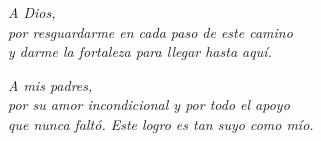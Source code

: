 
\vspace*{\fill}

\begin{flushright}
    \textit{A Dios,\\
    por resguardarme en cada paso de este camino\\
    y darme la fortaleza para llegar hasta aquí.}

    \vspace{1em}

    \textit{A mis padres,\\
    por su amor incondicional y por todo el apoyo\\
    que nunca faltó. Este logro es tan suyo como mío.}
\end{flushright}

\vspace*{\fill}
\MediaOptionLogic
